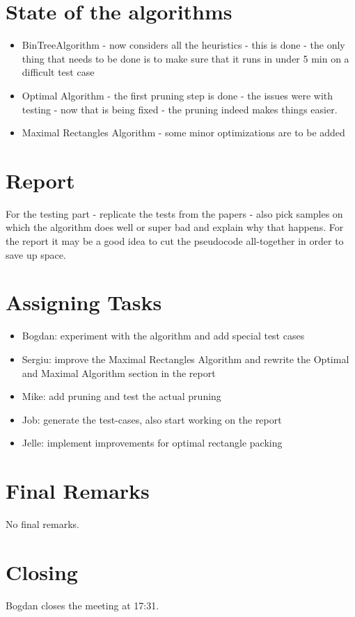 \documentclass[a4paper,twoside,11pt]{article}
\begin{document}
\section{State of the algorithms}
\begin{itemize}
	\item BinTreeAlgorithm - now considers all the heuristics - this is done - the only thing that needs to be done is to make sure that it runs in under 5 min on a difficult test case
	\item Optimal Algorithm - the first pruning step is done - the issues were with testing - now that is being fixed - the pruning indeed makes things easier.
	\item Maximal Rectangles Algorithm - some minor optimizations are to be added
\end{itemize}

\section{Report}
For the testing part - replicate the tests from the papers - also pick samples on which the algorithm does well or super bad and explain why that happens. For the report it may be a good idea to cut the pseudocode all-together in order to save up space.

\section{Assigning Tasks}
\begin{itemize}
	\item Bogdan: experiment with the algorithm and add special test cases 
	\item Sergiu: improve the Maximal Rectangles Algorithm and rewrite the Optimal and Maximal Algorithm section in the report 
	\item Mike: add pruning and test the actual pruning
	\item Job: generate the test-cases, also start working on the report
	\item Jelle: implement improvements for optimal rectangle packing
\end{itemize}

\section{Final Remarks}
No final remarks.

\section{Closing}

Bogdan closes the meeting at 17:31.
\end{document}
